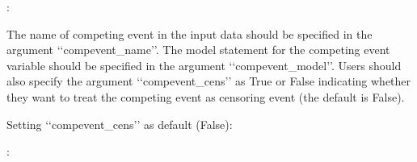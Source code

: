 \documentclass[letterpaper,10pt,english]{sphinxmanual}
\begin{document}
\sphinxAtStartPar
{}:

\begin{sphinxVerbatim}[commandchars=\\\{\}]
  
  
  

            
\end{sphinxVerbatim}

\sphinxAtStartPar
The name of competing event in the input data should be specified in the argument ‘‘compevent\_name’’.
The model statement for the competing event variable should be specified in the argument ‘‘compevent\_model’’.
Users should also specify the argument ‘‘compevent\_cens’’ as True or False indicating whether they want to treat the competing
event as censoring event (the default is False).

\sphinxAtStartPar
Setting ‘‘compevent\_cens’’ as default (False):

\sphinxAtStartPar
{} :
\end{document}
